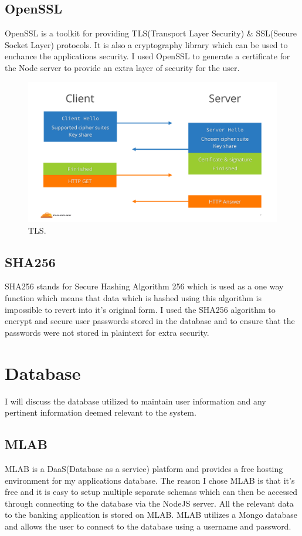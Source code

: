 \subsection{OpenSSL}
OpenSSL is a toolkit for providing TLS(Transport Layer Security) \& SSL(Secure Socket Layer) protocols.  It is also a cryptography library which can be used to enchance the applications security.  I used OpenSSL to generate a certificate for the Node server to provide an extra layer of security for the user.
\\
\begin{figure}[H]
  \includegraphics[width=\textwidth]{img/tls.png}
  \caption{TLS.}
  \label{fig: How TLS Works}
\end{figure}
\cite{TLS}
\subsection{SHA256}
SHA256 stands for Secure Hashing Algorithm 256 which is used as a one way function which means that data which is hashed using this algorithm is impossible to revert into it's original form\cite{SHA256}.  I used the SHA256 algorithm to encrypt and secure user passwords stored in the database and to ensure that the passwords were not stored in plaintext for extra security.
\section{Database}
I will discuss the database utilized to maintain user information and any pertinent information deemed relevant to the system.
\subsection{MLAB}
MLAB is a DaaS(Database as a service) platform and provides a free hosting environment for my applications database\cite{MLAB}.  The reason I chose MLAB is that it's free and it is easy to setup multiple separate schemas which can then be accessed through connecting to the database via the NodeJS server.  All the relevant data to the banking application is stored on MLAB.  MLAB utilizes a Mongo database and allows the user to connect to the database using a username and password.
